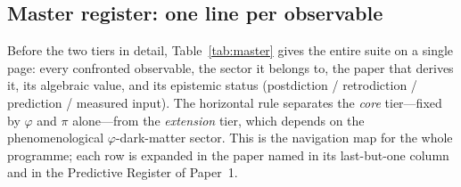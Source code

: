 \documentclass[a4paper,11pt]{article}
\begin{document}
\subsection{Master register: one line per observable}
\label{sec:master-register}

Before the two tiers in detail, Table~\ref{tab:master} gives the entire suite
on a single page: every confronted observable, the sector it belongs to, the
paper that derives it, its algebraic value, and its epistemic status
(postdiction / retrodiction / prediction / measured input). The horizontal rule
separates the \emph{core} tier---fixed by $\varphi$ and $\pi$ alone---from the
\emph{extension} tier, which depends on the phenomenological $\varphi$-dark-matter
sector. This is the navigation map for the whole programme; each row is expanded
in the paper named in its last-but-one column and in the Predictive Register of
Paper~1.
\end{document}
